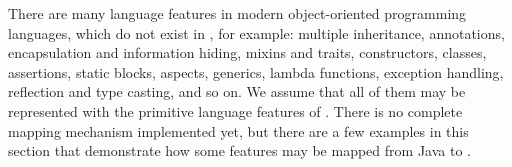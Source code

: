 There are many language features in modern object-oriented programming
languages, which do not exist in \eo{}, for example:
  multiple inheritance,
  annotations,
  encapsulation and information hiding,
  mixins and traits,
  constructors,
  classes,
  assertions,
  static blocks,
  aspects,
  generics,
  lambda functions,
  exception handling,
  reflection and type casting,
  and so on.
We assume that all of them may be represented with the primitive
language features of \eo{}. There is no complete mapping mechanism
implemented yet, but there are a few examples in this section
that demonstrate how some features may be mapped from Java to \eo{}.



